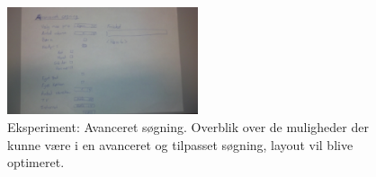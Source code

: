 \documentclass[12pt, a4paper]{report}
\begin{document}
\begin{figure}
\includegraphics[width=0.5\textwidth]{eksperiment_soeg}
\caption{Eksperiment: Avanceret søgning. Overblik over de muligheder der kunne være i en avanceret og tilpasset søgning, layout vil blive optimeret.}
\label{e_soeg}
\end{figure}
\end{document}
